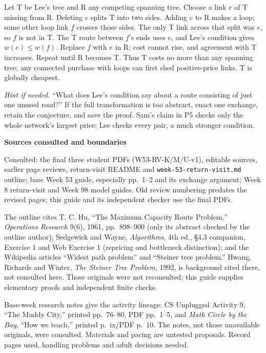 \documentclass[11pt]{article}
\newcommand{\sub}[1]{\par\textbf{#1}\par}
\newcommand{\hint}[1]{\textit{Hint if needed.} #1}
\begin{document}
Let T be Lee's tree and R any competing spanning tree. Choose a link $e$ of T missing from R. Deleting $e$ splits T into two sides. Adding $e$ to R makes a loop; some other loop link $f$ crosses those sides. The only T link across that split was $e$, so $f$ is not in T. The T route between $f$'s ends uses $e$, and Lee's condition gives $w(e)\le w(f)$. Replace $f$ with $e$ in R: cost cannot rise, and agreement with T increases. Repeat until R becomes T. Thus T costs no more than any spanning tree; any connected purchase with loops can first shed positive-price links. T is globally cheapest.

\hint{``What does Lee's condition say about a route consisting of just one unused road?''} If the full transformation is too abstract, enact one exchange, retain the conjecture, and save the proof. Sam's claim in P5 checks only the whole network's largest price; Lee checks every pair, a much stronger condition.

\sub{Sources consulted and boundaries}
{\small
Consulted: the final three student PDFs (W53-RV-K/M/U-v1), editable sources, earlier page reviews, return-visit README and \texttt{week-53-return-visit.md} outline; base Week 53 guide, especially pp.~1--2 and its exchange argument; Week 8 return-visit and Week 98 model guides. Old review numbering predates the revised pages; this guide and its independent checker use the final PDFs.

The outline cites T. C. Hu, ``The Maximum Capacity Route Problem,'' \textit{Operations Research} 9(6), 1961, pp.~898--900 (only its abstract checked by the outline author); Sedgewick and Wayne, \textit{Algorithms}, 4th ed., \S4.3 companion, Exercise 1 and Web Exercise 1 (repricing and bottleneck distinction); and the Wikipedia articles ``Widest path problem'' and ``Steiner tree problem.'' Hwang, Richards and Winter, \textit{The Steiner Tree Problem}, 1992, is background cited there, not consulted here. Those originals were not reconsulted; this guide supplies elementary proofs and independent finite checks.

Base-week research notes give the activity lineage: CS Unplugged Activity 9, ``The Muddy City,'' printed pp.~76--80, PDF pp.~1--5, and \textit{Math Circle by the Bay}, ``How we teach,'' printed p.~ix/PDF p.~10. The notes, not those unavailable originals, were consulted. Materials and pacing are untested proposals. Record pages used, handling problems and adult decisions needed.
}
\end{document}
